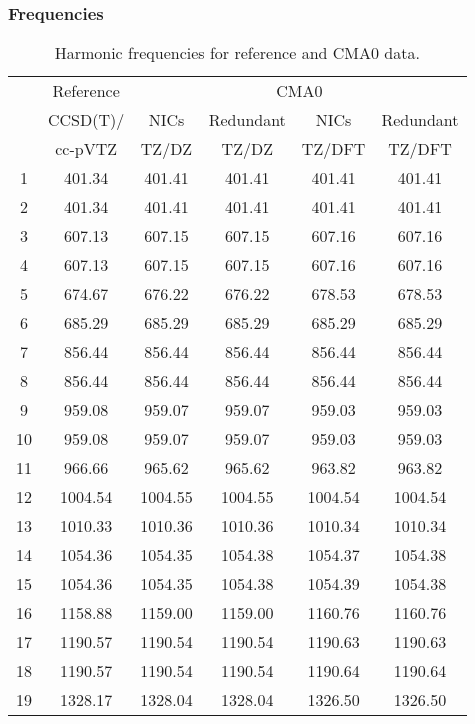 \documentclass[10pt,oneside]{article}
\begin{document}
\begin{table}[h!]
\subsubsection*{Frequencies}
\centering
\caption{Harmonic frequencies for reference and CMA0 data.}
\begin{tabular}{cccccc}
\toprule
{} & Reference & \multicolumn{4}{c}{CMA0} \\
{} &  CCSD(T)/ &    NICs &  Redundant &    NICs & Redundant \\
{} &   cc-pVTZ &   TZ/DZ &      TZ/DZ &  TZ/DFT &    TZ/DFT \\
\midrule
1  &    401.34 &  401.41 &     401.41 &  401.41 &    401.41 \\
2  &    401.34 &  401.41 &     401.41 &  401.41 &    401.41 \\
3  &    607.13 &  607.15 &     607.15 &  607.16 &    607.16 \\
4  &    607.13 &  607.15 &     607.15 &  607.16 &    607.16 \\
5  &    674.67 &  676.22 &     676.22 &  678.53 &    678.53 \\
6  &    685.29 &  685.29 &     685.29 &  685.29 &    685.29 \\
7  &    856.44 &  856.44 &     856.44 &  856.44 &    856.44 \\
8  &    856.44 &  856.44 &     856.44 &  856.44 &    856.44 \\
9  &    959.08 &  959.07 &     959.07 &  959.03 &    959.03 \\
10 &    959.08 &  959.07 &     959.07 &  959.03 &    959.03 \\
11 &    966.66 &  965.62 &     965.62 &  963.82 &    963.82 \\
12 &   1004.54 & 1004.55 &    1004.55 & 1004.54 &   1004.54 \\
13 &   1010.33 & 1010.36 &    1010.36 & 1010.34 &   1010.34 \\
14 &   1054.36 & 1054.35 &    1054.38 & 1054.37 &   1054.38 \\
15 &   1054.36 & 1054.35 &    1054.38 & 1054.39 &   1054.38 \\
16 &   1158.88 & 1159.00 &    1159.00 & 1160.76 &   1160.76 \\
17 &   1190.57 & 1190.54 &    1190.54 & 1190.63 &   1190.63 \\
18 &   1190.57 & 1190.54 &    1190.54 & 1190.64 &   1190.64 \\
19 &   1328.17 & 1328.04 &    1328.04 & 1326.50 &   1326.50 \\

\end{tabular}
\end{table}
\end{document}
